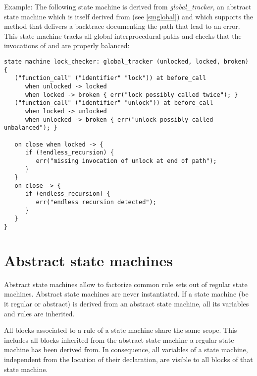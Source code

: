 \bigskip
\noindent
Example: The following state machine is derived from \textit{global\_tracker},
an abstract state machine which is itself
derived from  (see \ref{smglobal}) and which supports
the  method that delivers a backtrace documenting the
path that lead to an error. This state machine tracks all global
interprocedural paths and checks that the invocations of 
and  are properly balanced:

\begin{lstlisting}
state machine lock_checker: global_tracker (unlocked, locked, broken) {
   ("function_call" ("identifier" "lock")) at before_call
      when unlocked -> locked
      when locked -> broken { err("lock possibly called twice"); }
   ("function_call" ("identifier" "unlock")) at before_call
      when locked -> unlocked
      when unlocked -> broken { err("unlock possibly called unbalanced"); }

   on close when locked -> {
      if (!endless_recursion) {
         err("missing invocation of unlock at end of path");
      }
   }
   on close -> {
      if (endless_recursion) {
         err("endless recursion detected");
      }
   }
}
\end{lstlisting}

\section{Abstract state machines}

Abstract state machines allow to factorize common rule sets out of
regular state machines. Abstract state machines are never instantiated.
If a state machine (be it regular or abstract) is derived from an
abstract state machine, all its variables and rules are inherited.

All blocks associated to a rule of a state machine share the same
scope. This includes all blocks inherited from the abstract state
machine a regular state machine has been derived from. In consequence,
all variables of a state machine, independent from the location
of their declaration, are visible to all blocks of that state machine.

\begin{grammar}
      \produces {} 
	   \nextline
	 \lextoken{\{}  
	 \lextoken{\}} \\
      \produces {} 
	  
	 \lextoken{:}  \nextline
	 \lextoken{\{}  
	 \lextoken{\}}
\end{grammar}

